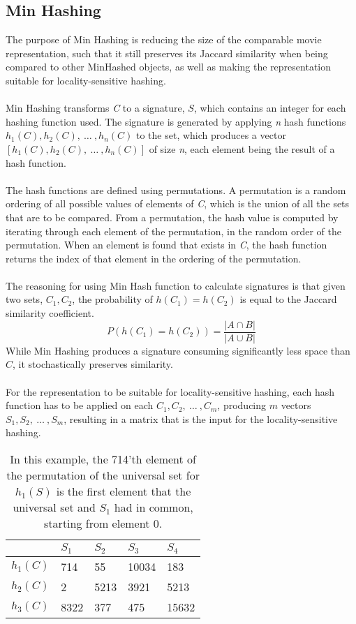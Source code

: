 \subsection{Min Hashing}
The purpose of Min Hashing is reducing the size of the comparable movie representation, such that it still preserves its Jaccard similarity when being compared to other MinHashed objects, as well as making the representation suitable for locality-sensitive hashing.\\ \\
Min Hashing transforms \textit{C} to a signature, \(S\), which contains an integer for each hashing function used. The signature is generated by applying \textit{n} hash functions \(h_1(C), h_2(C),\ \dots\ , h_n(C)\) to the set, which produces a vector \([h_1(C), h_2(C),\ \dots\ , h_n(C)]\) of size \textit{n}, each element being the result of a hash function.\\ \\
The hash functions are defined using permutations. A permutation is a random ordering of all possible values of elements of \textit{C}, which is the union of all the sets that are to be compared. From a permutation, the hash value is computed by iterating through each element of the permutation, in the random order of the permutation. When an element is found that exists in \textit{C}, the hash function returns the index of that element in the ordering of the permutation.\\ \\
The reasoning for using Min Hash function to calculate signatures is that given two sets, \(C_1, C_2\), the probability of \(h(C_1) = h(C_2)\) is equal to the Jaccard similarity coefficient.
\begin{equation}
P(h(C_1) = h(C_2)) = \frac{|A \cap B|}{|A \cup B|}
\end{equation}
While Min Hashing produces a signature consuming significantly less space than \(C\), it stochastically preserves similarity.\\ \\
For the representation to be suitable for locality-sensitive hashing, each hash function has to be applied on each \(C_1, C_2,\ \dots\ , C_m\), producing \(m\) vectors \(S_1, S_2,\ \dots\ , S_m\), resulting in a matrix that is the input for the locality-sensitive hashing.

\begin{table}[h]
\begin{tabular}{l||l|l|l|l}
 & \(S_1\) & \(S_2\)  & \(S_3\)  &  \(S_4\) \\ \hline \hline
 \(h_1(C)\) &   714  & 55 & 10034 & 183 \\ \hline
  \(h_2(C)\) &     2 & 5213 & 3921 & 5213 \\ \hline
 \(h_3(C)\) &     8322 & 377  & 475 & 15632
\end{tabular}
\centering
\caption{In this example, the 714'th element of the permutation of the universal set for \(h_1(S)\) is the first element that the universal set and \(S_1\) had in common, starting from element 0.}
\end{table}